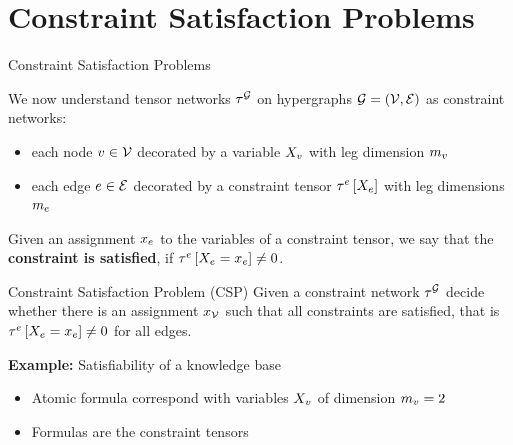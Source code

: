 \documentclass{beamer}
\begin{document}
    {\frame[plain]{\titlepage}}


    \section{Constraint Satisfaction Problems}

    \begin{frame}{Constraint Satisfaction Problems}

        We now understand tensor networks $\tau^{\mathcal{G}}$ on hypergraphs $\mathcal{G}=(\mathcal{V},\mathcal{E})$ as constraint networks:
        \begin{itemize}
            \item each node $v\in\mathcal{V}$ decorated by a variable $X_{v}$ with leg dimension $m_{v}$
            \item each edge $e\in\mathcal{E}$ decorated by a constraint tensor $\tau^{e}\left[X_{e}\right]$ with leg dimensions $m_{e}$
        \end{itemize}
        Given an assignment $x_{e}$ to the variables of a constraint tensor, we say that the \textbf{constraint is satisfied}, if $\tau^{e}\left[X_{e}=x_{e}\right]\neq 0$.

        \begin{block}{Constraint Satisfaction Problem (CSP)}
            Given a constraint network $\tau^{\mathcal{G}}$ decide whether there is an assignment $x_{\mathcal{V}}$ such that all constraints are satisfied, that is $\tau^{e}\left[X_{e}=x_{e}\right]\neq0$ for all edges.
        \end{block}

            {\bf Example:} Satisfiability of a knowledge base
        \begin{itemize}
            \item Atomic formula correspond with variables $X_{v}$ of dimension $m_{v}=2$
            \item Formulas are the constraint tensors
        \end{itemize}

    \end{frame}
\end{document}
